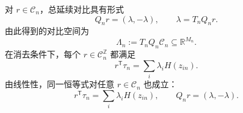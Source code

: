 对 $r\in\mathcal C_n$，总延续对比具有形式
\[
Q_nr=(\lambda,-\lambda),
\qquad
\lambda=T_nQ_nr.
\]
由此得到的对比空间为
\begin{equation}
\boxed{
\Lambda_n:=T_nQ_n\mathcal C_n
\subseteq\mathbb R^{M_n}.}
\label{eq:gap-weight-space}
\end{equation}
在消去条件下，每个 $r\in\mathcal C_n^{\mathbb Z}$ 都满足
\[
r^{\mathsf T}\tau_n
=
\sum_i\lambda_iH(z_{in}).
\]
由线性性，同一恒等式对任意 $r\in\mathcal C_n$ 也成立：
\begin{equation}
r^{\mathsf T}\tau_n
=
\sum_i\lambda_iH(z_{in}),
\qquad
Q_nr=(\lambda,-\lambda).
\label{eq:gap-cycle-price}
\end{equation}
